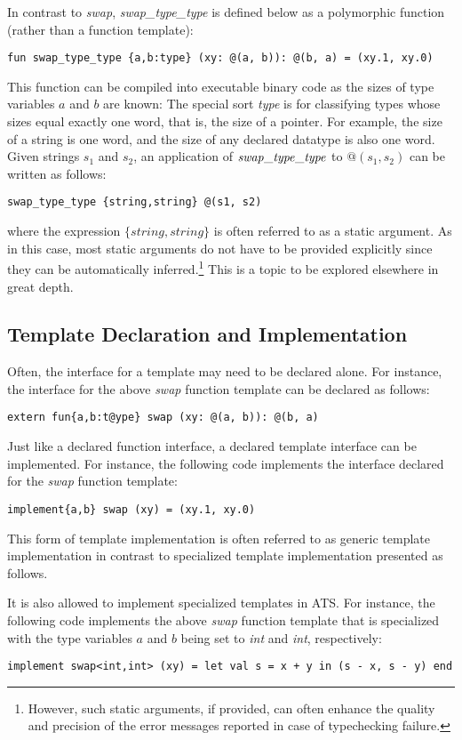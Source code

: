 In contrast to {\it swap}, {\it swap\_type\_type} is defined below as a
polymorphic function (rather than a function template):
\begin{verbatim}
fun swap_type_type {a,b:type} (xy: @(a, b)): @(b, a) = (xy.1, xy.0)
\end{verbatim}
This function can be compiled into executable binary code as the sizes of
type variables $a$ and $b$ are known: The special sort {\it type} is for
classifying types whose sizes equal exactly one word, that is, the size of
a pointer. For example, the size of a string is one word, and the size of
any declared datatype is also one word.  Given strings $s_1$ and $s_2$, an
application of ${\it swap\_type\_type}$ to $@(s_1, s_2)$ can be written as
follows:
\begin{center}
\texttt{swap\_type\_type \{string,string\} @(s1, s2)}
\end{center}
where the expression $\{string,string\}$ is often referred to as a static
argument. As in this case, most static arguments do not have to be provided
explicitly since they can be automatically inferred.\footnote{However, such
static arguments, if provided, can often enhance the quality and precision
of the error messages reported in case of typechecking failure.} This is a
topic to be explored elsewhere in great depth.

\subsection{Template Declaration and Implementation}
Often, the interface for a template may need to be declared alone.  For
instance, the interface for the above {\it swap} function template can be
declared as follows:
\begin{verbatim}
extern fun{a,b:t@ype} swap (xy: @(a, b)): @(b, a)
\end{verbatim}
Just like a declared function interface, a declared template interface can
be implemented.  For instance, the following code implements the interface
declared for the {\it swap} function template:
\begin{verbatim}
implement{a,b} swap (xy) = (xy.1, xy.0)
\end{verbatim}
This form of template implementation is often referred to as generic
template implementation in contrast to specialized template implementation
presented as follows.

It is also allowed to implement specialized templates in ATS. For instance,
the following code implements the above {\it swap} function template that
is specialized with the type variables $a$ and $b$ being set to {\it int}
and {\it int}, respectively:
\begin{verbatim}
implement swap<int,int> (xy) = let val s = x + y in (s - x, s - y) end
\end{verbatim}

